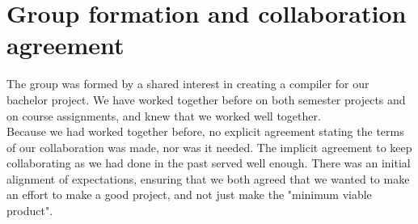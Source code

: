 \section{Group formation and collaboration agreement}

The group was formed by a shared interest in creating a compiler for our bachelor project. We have worked together before on both semester projects and on course assignments, and knew that we worked well together.\\
Because we had worked together before, no explicit agreement stating the terms of our collaboration was made, nor was it needed. The implicit agreement to keep collaborating as we had done in the past served well enough. There was an initial alignment of expectations, ensuring that we both agreed that we wanted to make an effort to make a good project, and not just make the "minimum viable product". 
  